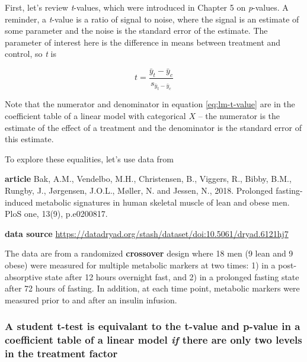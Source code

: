 \documentclass[]{book}
\begin{document}
First, let's review \emph{t}-values, which were introduced in Chapter 5
on \emph{p}-values. A reminder, a \emph{t}-value is a ratio of signal to
noise, where the signal is an estimate of some parameter and the noise
is the standard error of the estimate. The parameter of interest here is
the difference in means between treatment and control, so \emph{t} is

\begin{equation}
t = \frac{\bar{y}_t - \bar{y}_c}{s_{\bar{y}_t - \bar{y}_c}}
\label{eq:lm-t-value}
\end{equation}

Note that the numerator and denominator in equation \eqref{eq:lm-t-value}
are in the coefficient table of a linear model with categorical \(X\) --
the numerator is the estimate of the effect of a treatment and the
denominator is the standard error of this estimate.

To explore these equalities, let's use data from

\textbf{article} Bak, A.M., Vendelbo, M.H., Christensen, B., Viggers,
R., Bibby, B.M., Rungby, J., Jørgensen, J.O.L., Møller, N. and Jessen,
N., 2018. Prolonged fasting-induced metabolic signatures in human
skeletal muscle of lean and obese men. PloS one, 13(9), p.e0200817.

\textbf{data source}
\url{https://datadryad.org/stash/dataset/doi:10.5061/dryad.6121hj7}

The data are from a randomized \textbf{crossover} design where 18 men (9
lean and 9 obese) were measured for multiple metabolic markers at two
times: 1) in a post-absorptive state after 12 hours overnight fast, and
2) in a prolonged fasting state after 72 hours of fasting. In addition,
at each time point, metabolic markers were measured prior to and after
an insulin infusion.

\subsubsection{\texorpdfstring{A student t-test is equivalant to the
t-value and p-value in a coefficient table of a linear model \emph{if}
there are only two levels in the treatment
factor}{A student t-test is equivalant to the t-value and p-value in a coefficient table of a linear model if there are only two levels in the treatment factor}}\label{a-student-t-test-is-equivalant-to-the-t-value-and-p-value-in-a-coefficient-table-of-a-linear-model-if-there-are-only-two-levels-in-the-treatment-factor}
\end{document}
